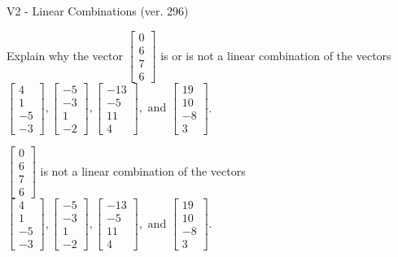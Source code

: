 \begin{exercise}
  \begin{exerciseTitle}V2 - Linear Combinations (ver. 296)\end{exerciseTitle}
  \begin{exerciseStatement}
    Explain why the vector \(\left[\begin{array}{c}
0 \\
6 \\
7 \\
6
\end{array}\right]\)  is or is not a linear 
	combination of the vectors \(\left[\begin{array}{c}
4 \\
1 \\
-5 \\
-3
\end{array}\right] , \left[\begin{array}{c}
-5 \\
-3 \\
1 \\
-2
\end{array}\right] , \left[\begin{array}{c}
-13 \\
-5 \\
11 \\
4
\end{array}\right] , \text{ and } \left[\begin{array}{c}
19 \\
10 \\
-8 \\
3
\end{array}\right]\).
	


  \end{exerciseStatement}
  \begin{exerciseAnswer}
   \(\left[\begin{array}{c}
0 \\
6 \\
7 \\
6
\end{array}\right]\) 
  	 is not  
	a linear combination of the vectors \(\left[\begin{array}{c}
4 \\
1 \\
-5 \\
-3
\end{array}\right] , \left[\begin{array}{c}
-5 \\
-3 \\
1 \\
-2
\end{array}\right] , \left[\begin{array}{c}
-13 \\
-5 \\
11 \\
4
\end{array}\right] , \text{ and } \left[\begin{array}{c}
19 \\
10 \\
-8 \\
3
\end{array}\right]\).


\end{exerciseAnswer}
\end{exercise}
